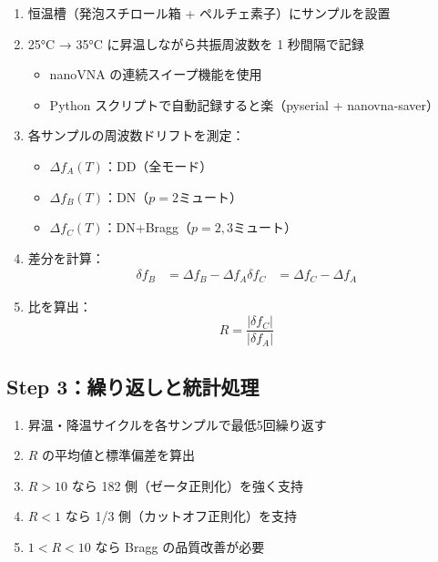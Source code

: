 \documentclass[11pt,a4paper]{article}
\def\mathrm#1{#1}%
\def\textbf#1{#1}%
\def\\{ }%
\begin{document}
\begin{enumerate}[leftmargin=*]
\item 恒温槽（発泡スチロール箱 + ペルチェ素子）にサンプルを設置
\item 25°C → 35°C に昇温しながら共振周波数を 1 秒間隔で記録
  \begin{itemize}
  \item nanoVNA の連続スイープ機能を使用
  \item Python スクリプトで自動記録すると楽（pyserial + nanovna-saver）
  \end{itemize}
\item 各サンプルの周波数ドリフトを測定：
  \begin{itemize}
  \item $\Delta f_{\mathrm{A}}(T)$：DD（全モード）
  \item $\Delta f_{\mathrm{B}}(T)$：DN（$p=2$ミュート）
  \item $\Delta f_{\mathrm{C}}(T)$：DN+Bragg（$p=2,3$ミュート）
  \end{itemize}
\item 差分を計算：
  \begin{align}
    \delta f_{\mathrm{B}} &= \Delta f_{\mathrm{B}} - \Delta f_{\mathrm{A}} \\
    \delta f_{\mathrm{C}} &= \Delta f_{\mathrm{C}} - \Delta f_{\mathrm{A}}
  \end{align}
\item \textbf{比を算出}：
  \begin{equation}
    \boxed{\; R = \frac{|\delta f_{\mathrm{C}}|}{|\delta f_{\mathrm{A}}|} \;}
  \end{equation}
\end{enumerate}

\subsection{Step 3：繰り返しと統計処理}

\begin{enumerate}[leftmargin=*]
\item 昇温・降温サイクルを各サンプルで最低5回繰り返す
\item $R$ の平均値と標準偏差を算出
\item $R > 10$ なら 182 側（ゼータ正則化）を強く支持
\item $R < 1$ なら 1/3 側（カットオフ正則化）を支持
\item $1 < R < 10$ なら Bragg の品質改善が必要
\end{enumerate}
\end{document}
